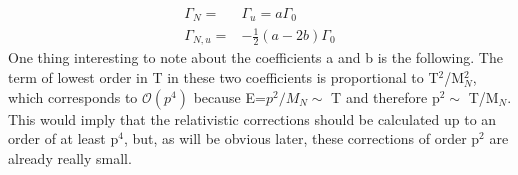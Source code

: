 \begin{align}
	\Gamma_N=&\Gamma_u=a\Gamma_0\\
	\Gamma_{N,u}=&-\frac{1}{2}(a-2b)\Gamma_0
\end{align}
One thing interesting to note about the coefficients a and b is the following. The term of lowest order in T in these two coefficients is proportional to T$^2$/M$_N^2$, which corresponds to $\mathcal{O}(p^4)$ because E=$p^2/M_N\sim$ T and therefore p$^2\sim$ T/M$_N$. This would imply that the relativistic corrections should be calculated up to an order of at least p$^4$, but, as will be obvious later, these corrections of order p$^2$ are already really small.
